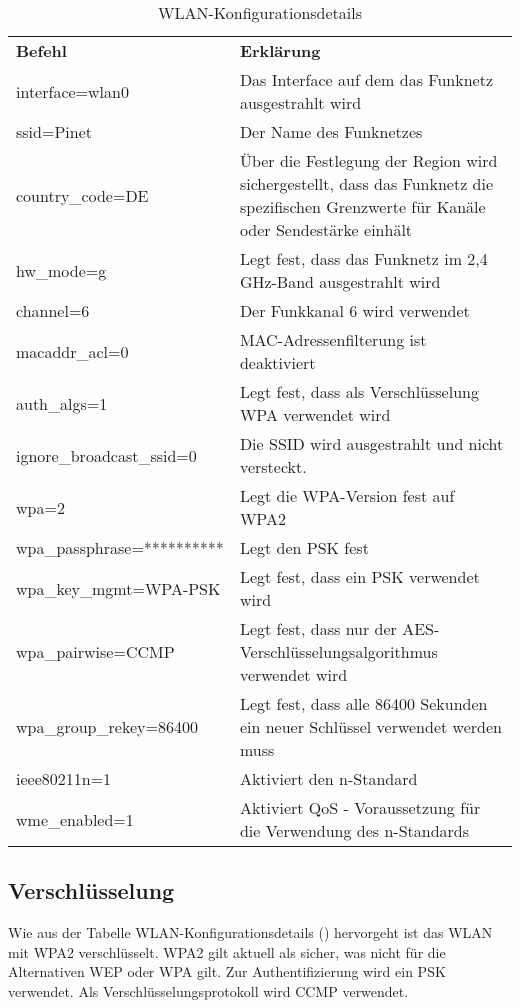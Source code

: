  
\begin{table}
\caption{WLAN-Konfigurationsdetails}
\label{tab:WLAN-Konfiguration}
\begin{tabular}{p{} p{}}
\textbf{Befehl} 						& \textbf{Erklärung} \\
interface=wlan0 						& Das Interface auf dem das Funknetz ausgestrahlt wird \\
ssid=Pinet 									& Der Name des Funknetzes \\
country\_code=DE 						& Über die Festlegung der Region wird sichergestellt, dass das Funknetz die spezifischen Grenzwerte für Kanäle oder Sendestärke einhält \\
hw\_mode=g 									& Legt fest, dass das Funknetz im 2,4 GHz-Band ausgestrahlt wird \\
channel=6 									& Der Funkkanal 6 wird verwendet \\
macaddr\_acl=0 							& MAC-Adressenfilterung ist deaktiviert \\
auth\_algs=1 								& Legt fest, dass als Verschlüsselung \ac{WPA} verwendet wird \\
ignore\_broadcast\_ssid=0 	& Die \ac{SSID} wird ausgestrahlt und nicht versteckt. \\
wpa=2 											& Legt die WPA-Version fest auf \ac{WPA2} \\
wpa\_passphrase=********** 	& Legt den \ac{PSK} fest \\
wpa\_key\_mgmt=WPA-PSK 			& Legt fest, dass ein \ac{PSK} verwendet wird \\
wpa\_pairwise=CCMP 					& Legt fest, dass nur der \ac{AES}-Verschlüsselungsalgorithmus verwendet wird \\
wpa\_group\_rekey=86400 		& Legt fest, dass alle 86400 Sekunden ein neuer Schlüssel verwendet werden muss \\
ieee80211n=1 								& Aktiviert den n-Standard \\
wme\_enabled=1 							& Aktiviert \ac{QoS} - Voraussetzung für die Verwendung des n-Standards \\
 \end{tabular}
\end{table}

\subsection{Verschlüsselung}

Wie aus der Tabelle WLAN-Konfigurationsdetails () hervorgeht ist das WLAN mit \ac{WPA2} verschlüsselt. \ac{WPA2} gilt aktuell als sicher, was nicht für die Alternativen \ac{WEP} oder \ac{WPA} gilt. Zur Authentifizierung wird ein \ac{PSK} verwendet. Als Verschlüsselungsprotokoll wird \ac{CCMP} verwendet. 


